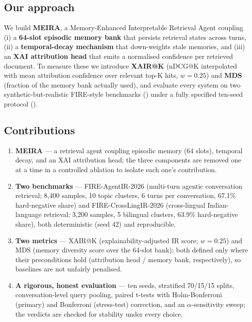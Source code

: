 \subsection{Our approach}
\label{sec:intro-approach}

We build \textbf{MEIRA}, a Memory-Enhanced Interpretable Retrieval Agent coupling (i) a \textbf{64-slot episodic memory bank} that persists retrieval states across turns, (ii) a \textbf{temporal-decay mechanism} that down-weights stale memories, and (iii) an \textbf{XAI attribution head} that emits a normalised confidence per retrieved document. To measure these we introduce \textbf{XAIR@K} (nDCG@K interpolated with mean attribution confidence over relevant top-K hits, $w = 0.25$) and \textbf{MDS} (fraction of the memory bank actually used), and evaluate every system on two synthetic-but-realistic FIRE-style benchmarks () under a fully specified ten-seed protocol ().

\subsection{Contributions}
\label{sec:intro-contributions}

\begin{enumerate}

  \item \textbf{MEIRA} --- a retrieval agent coupling episodic memory (64 slots), temporal decay, and an XAI attribution head; the three components are removed one at a time in a controlled ablation to isolate each one's contribution.

  \item \textbf{Two benchmarks} --- FIRE-AgentIR-2026 (multi-turn agentic conversation retrieval; 8,400 samples, 10 topic clusters, 6 turns per conversation, 67.1\% hard-negative share) and FIRE-CrossLingIR-2026 (cross-lingual Indian-language retrieval; 3,200 samples, 5 bilingual clusters, 63.9\% hard-negative share), both deterministic (seed 42) and reproducible.

  \item \textbf{Two metrics} --- XAIR@K (explainability-adjusted IR score; $w = 0.25$) and MDS (memory diversity score over the 64-slot bank); both defined only where their preconditions hold (attribution head / memory bank, respectively), so baselines are not unfairly penalised.

  \item \textbf{A rigorous, honest evaluation} --- ten seeds, stratified 70/15/15 splits, conversation-level query pooling, paired t-tests with Holm-Bonferroni (primary) and Bonferroni (stress-test) correction, and an $\alpha$-sensitivity sweep; the verdicts are checked for stability under every choice.

\end{enumerate}

